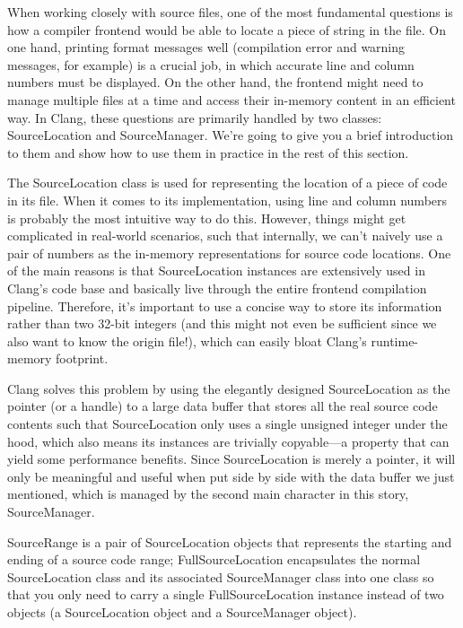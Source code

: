 When working closely with source files, one of the most fundamental questions is how a compiler frontend would be able to locate a piece of string in the file. On one hand, printing format messages well (compilation error and warning messages, for example) is a crucial job, in which accurate line and column numbers must be displayed. On the other hand, the frontend might need to manage multiple files at a time and access their in-memory content in an efficient way. In Clang, these questions are primarily handled by two classes: SourceLocation and SourceManager. We're going to give you a brief introduction to them and show how to use them in practice in the rest of this section.


The SourceLocation class is used for representing the location of a piece of code in its file. When it comes to its implementation, using line and column numbers is probably the most intuitive way to do this. However, things might get complicated in real-world scenarios, such that internally, we can't naively use a pair of numbers as the in-memory representations for source code locations. One of the main reasons is that SourceLocation instances are extensively used in Clang's code base and basically live through the entire frontend compilation pipeline. Therefore, it's important to use a concise way to store its information rather than two 32-bit integers (and this might not even be sufficient since we also want to know the origin file!), which can easily bloat Clang's runtime-memory footprint.

Clang solves this problem by using the elegantly designed SourceLocation as the pointer (or a handle) to a large data buffer that stores all the real source code contents such that SourceLocation only uses a single unsigned integer under the hood, which also means its instances are trivially copyable—a property that can yield some performance benefits. Since SourceLocation is merely a pointer, it will only be meaningful and useful when put side by side with the data buffer we just mentioned, which is managed by the second main character in this story, SourceManager.

\begin{tcolorbox}[colback=blue!5!white,colframe=blue!75!black, fonttitle=\bfseries,title=Other useful utilities]
\hspace*{0.7cm}SourceRange is a pair of SourceLocation objects that represents the starting and ending of a source code range; FullSourceLocation encapsulates the normal SourceLocation class and its associated SourceManager class into one class so that you only need to carry a single FullSourceLocation instance instead of two objects (a SourceLocation object and a SourceManager object).
\end{tcolorbox}

